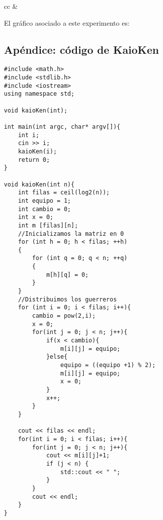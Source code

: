 \documentclass[10pt,a4paper]{article}
\begin{document}
\begin{table}[h!]
\begin{tabular}{cc}
                  &  \\ \hline
                                                                                                                                          
\end{tabular}
\caption{Tabla que muestra los tiempos de ejecución correspondientes a distintos tamaños de entrada.}
\end{table}

El gráfico asociado a este experimento es:

\newpage

\subsection{Apéndice: código de KaioKen}
\begin{lstlisting}
#include <math.h>
#include <stdlib.h>
#include <iostream>
using namespace std;

void kaioKen(int);

int main(int argc, char* argv[]){
	int i;
	cin >> i;
	kaioKen(i);
	return 0;
}

void kaioKen(int n){
	int filas = ceil(log2(n));
	int equipo = 1;
	int cambio = 0;
	int x = 0;
	int m [filas][n];
	//Inicializamos la matriz en 0
	for (int h = 0; h < filas; ++h)
	{
		for (int q = 0; q < n; ++q)
		{
			m[h][q] = 0;
		}
	}
	//Distribuimos los guerreros
	for (int i = 0; i < filas; i++){
		cambio = pow(2,i);
		x = 0;
		for(int j = 0; j < n; j++){
			if(x < cambio){
				m[i][j] = equipo;
			}else{
				equipo = ((equipo +1) % 2);
				m[i][j] = equipo;
				x = 0;
			}
			x++;
		}
	}

	cout << filas << endl;
	for(int i = 0; i < filas; i++){
		for(int j = 0; j < n; j++){
			cout << m[i][j]+1;
			if (j < n) {
				std::cout << " ";
			}
		}
		cout << endl;
	}
}
\end{lstlisting}
\end{document}

